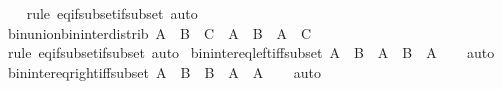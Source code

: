 \begin{isabellebody}
%
\isadelimproof
\ \ %
\endisadelimproof
%
\isatagproof
{}\isamarkupfalse%
\ {\isacharparenleft}{\kern0pt}rule\ eq{\isacharunderscore}{\kern0pt}if{\isacharunderscore}{\kern0pt}subset{\isacharunderscore}{\kern0pt}if{\isacharunderscore}{\kern0pt}subset{\isacharparenright}{\kern0pt}\ auto%
\endisatagproof
{\isafoldproof}%
%
\isadelimproof
\isanewline
%
\endisadelimproof
\isanewline
{}\isamarkupfalse%
\ bin{\isacharunderscore}{\kern0pt}union{\isacharunderscore}{\kern0pt}bin{\isacharunderscore}{\kern0pt}inter{\isacharunderscore}{\kern0pt}distrib{\isacharprime}{\kern0pt}{\isacharcolon}{\kern0pt}\ {\isachardoublequoteopen}A\ {\isasymunion}\ {\isacharparenleft}{\kern0pt}B\ {\isasyminter}\ C{\isacharparenright}{\kern0pt}\ {\isacharequal}{\kern0pt}\ {\isacharparenleft}{\kern0pt}A\ {\isasymunion}\ B{\isacharparenright}{\kern0pt}\ {\isasyminter}\ {\isacharparenleft}{\kern0pt}A\ {\isasymunion}\ C{\isacharparenright}{\kern0pt}{\isachardoublequoteclose}\isanewline
%
\isadelimproof
\ \ %
\endisadelimproof
%
\isatagproof
{}\isamarkupfalse%
\ {\isacharparenleft}{\kern0pt}rule\ eq{\isacharunderscore}{\kern0pt}if{\isacharunderscore}{\kern0pt}subset{\isacharunderscore}{\kern0pt}if{\isacharunderscore}{\kern0pt}subset{\isacharparenright}{\kern0pt}\ auto%
\endisatagproof
{\isafoldproof}%
%
\isadelimproof
\isanewline
%
\endisadelimproof
\isanewline
{}\isamarkupfalse%
\ bin{\isacharunderscore}{\kern0pt}inter{\isacharunderscore}{\kern0pt}eq{\isacharunderscore}{\kern0pt}left{\isacharunderscore}{\kern0pt}iff{\isacharunderscore}{\kern0pt}subset{\isacharcolon}{\kern0pt}\ {\isachardoublequoteopen}A\ {\isasymsubseteq}\ B\ {\isasymlongleftrightarrow}\ A\ {\isasyminter}\ B\ {\isacharequal}{\kern0pt}\ A{\isachardoublequoteclose}\isanewline
%
\isadelimproof
\ \ %
\endisadelimproof
%
\isatagproof
{}\isamarkupfalse%
\ auto%
\endisatagproof
{\isafoldproof}%
%
\isadelimproof
\isanewline
%
\endisadelimproof
\isanewline
{}\isamarkupfalse%
\ bin{\isacharunderscore}{\kern0pt}inter{\isacharunderscore}{\kern0pt}eq{\isacharunderscore}{\kern0pt}right{\isacharunderscore}{\kern0pt}iff{\isacharunderscore}{\kern0pt}subset{\isacharcolon}{\kern0pt}\ {\isachardoublequoteopen}A\ {\isasymsubseteq}\ B\ {\isasymlongleftrightarrow}\ B\ {\isasyminter}\ A\ {\isacharequal}{\kern0pt}\ A{\isachardoublequoteclose}\isanewline
%
\isadelimproof
\ \ %
\endisadelimproof
%
\isatagproof
{}\isamarkupfalse%
\ auto%
\endisatagproof
{\isafoldproof}%
%
\isadelimproof
\isanewline
%
\endisadelimproof
\isanewline
{}\isamarkupfalse%

\end{isabellebody}
